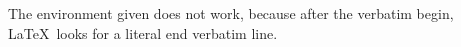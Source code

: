 The environment given does not work, because after the verbatim begin,
\LaTeX\ looks for a literal end verbatim line.
